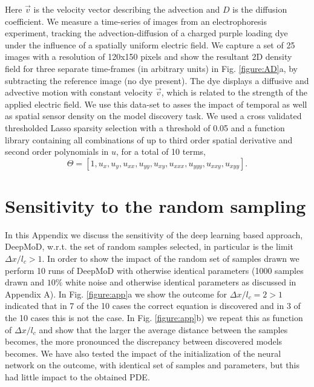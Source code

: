 \documentclass{article} %
\begin{document}
Here $\vec{v}$ is the velocity vector describing the advection and $D$ is the diffusion coefficient. We measure a time-series of images from an electrophoresis experiment, tracking the advection-diffusion of a charged purple loading dye under the influence of a spatially uniform electric field. We capture a set of 25 images with a resolution of 120x150 pixels and show the resultant 2D density field for three separate time-frames (in arbitrary units) in Fig. \ref{figure:AD}a, by subtracting the reference image (no dye present). The dye displays a diffusive and advective motion with constant velocity $\vec{v}$, which is related to the strength of the applied electric field. We use this data-set to asses the impact of temporal as well as spatial sensor density on the model discovery task.  We used a cross validated thresholded Lasso sparsity selection with a threshold of 0.05 and a function library containing all combinations of up to third order spatial derivative and second order polynomials in $u$, for a total of 10 terms, 
\begin{equation}
    {\Theta} = \left[1,u_x,u_y, u_{xx},u_{yy}, u_{xy}, u_{xxx}, u_{yyy}, u_{xxy}, u_{xyy}\right].
\end{equation}
%

\section{Sensitivity to the random sampling}

In this Appendix we discuss the sensitivity of the deep learning based approach, DeepMoD, w.r.t. the set of random samples selected, in particular is the limit $\Delta x /l_c > 1$. In order to show the impact of the random set of samples drawn we perform 10 runs of DeepMoD with otherwise identical parameters (1000 samples drawn and $10\%$ white noise and otherwise identical parameters as discussed in Appendix A). In Fig. \ref{figure:app}a we show the outcome for $\Delta x/l_c = 2 > 1$ indicated that in 7 of the 10 cases the correct equation is discovered and in 3 of the 10 cases this is not the case. In Fig. \ref{figure:app}b) we repeat this as function of $\Delta x/l_c$ and show that the larger the average distance between the samples becomes, the more pronounced the discrepancy between discovered models becomes. We have also tested the impact of the initialization of the neural network on the outcome, with identical set of samples and parameters, but this had little impact to the obtained PDE.
\end{document}
